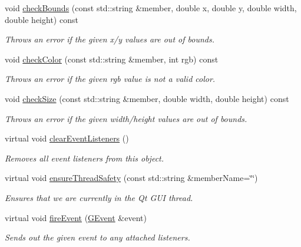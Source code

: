 \begin{DoxyCompactItemize}
\item 
void \mbox{\hyperlink{classsgl_1_1GDrawingSurface_a3a690bcb2d62250c9e4722ad7c1b9ab6}{check\+Bounds}} (const std\+::string \&member, double x, double y, double width, double height) const
\begin{DoxyCompactList}\small\item\em Throws an error if the given x/y values are out of bounds. \end{DoxyCompactList}\item 
void \mbox{\hyperlink{classsgl_1_1GDrawingSurface_a9841b5dc607ca41a14819d80e1d8a09c}{check\+Color}} (const std\+::string \&member, int rgb) const
\begin{DoxyCompactList}\small\item\em Throws an error if the given rgb value is not a valid color. \end{DoxyCompactList}\item 
void \mbox{\hyperlink{classsgl_1_1GDrawingSurface_a70a6546707ae708573396616bd0f5320}{check\+Size}} (const std\+::string \&member, double width, double height) const
\begin{DoxyCompactList}\small\item\em Throws an error if the given width/height values are out of bounds. \end{DoxyCompactList}\item 
virtual void \mbox{\hyperlink{classsgl_1_1GObservable_a80cfa040459ff53594adbd6a51ec8f43}{clear\+Event\+Listeners}} ()
\begin{DoxyCompactList}\small\item\em Removes all event listeners from this object. \end{DoxyCompactList}\item 
virtual void \mbox{\hyperlink{classsgl_1_1GObservable_a284f31528c0520f8e545c03ac9eeac74}{ensure\+Thread\+Safety}} (const std\+::string \&member\+Name=\char`\"{}\char`\"{})
\begin{DoxyCompactList}\small\item\em Ensures that we are currently in the Qt G\+UI thread. \end{DoxyCompactList}\item 
virtual void \mbox{\hyperlink{classsgl_1_1GObservable_a63e5e5a6227c59c928493b11aceb0f67}{fire\+Event}} (\mbox{\hyperlink{classsgl_1_1GEvent}{G\+Event}} \&event)
\begin{DoxyCompactList}\small\item\em Sends out the given event to any attached listeners. \end{DoxyCompactList}\item 

\end{DoxyCompactItemize}
